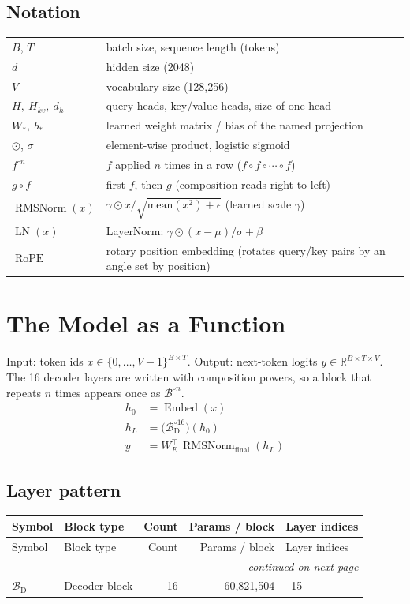 \documentclass[10pt,a4paper]{article}
\newcommand{\op}[1]{\operatorname{#1}}
\begin{document}
\subsection*{Notation}
\begin{tabular}{ll}
\toprule
$B$, $T$ & batch size, sequence length (tokens) \\
$d$ & hidden size (2048) \\
$V$ & vocabulary size (128,256) \\
$H,\ H_{kv},\ d_h$ & query heads, key/value heads, size of one head \\
$W_\ast,\ b_\ast$ & learned weight matrix / bias of the named projection \\
$\odot$, $\sigma$ & element-wise product, logistic sigmoid \\
$f^{\circ n}$ & $f$ applied $n$ times in a row ($f\circ f\circ\cdots\circ f$) \\
$g \circ f$ & first $f$, then $g$ (composition reads right to left) \\
$\op{RMSNorm}(x)$ & $\gamma \odot x / \sqrt{\mathrm{mean}(x^2)+\epsilon}$ (learned scale $\gamma$) \\
$\op{LN}(x)$ & LayerNorm: $\gamma\odot(x-\mu)/\sigma + \beta$ \\
$\op{RoPE}$ & rotary position embedding (rotates query/key pairs by an angle set by position) \\
\bottomrule
\end{tabular}
\section{The Model as a Function}\label{sec:func}
Input: token ids $x \in \{0,\dots,V{-}1\}^{B\times T}$. Output: next-token logits $y \in \mathbb{R}^{B\times T\times V}$. The 16 decoder layers are written with composition powers, so a block that repeats $n$ times appears once as $\mathcal{B}^{\circ n}$.
\begin{align*}
  h_0 &= \op{Embed}(x) \\
  h_L &= \Big(\mathcal{B}_{\mathrm{D}}^{\circ 16}\Big)(h_0) \\
  y &= W_{E}^{\top}\,\op{RMSNorm}_{\mathrm{final}}(h_L)
\end{align*}
\subsection{Layer pattern}
\begin{longtable}{l>{\raggedright\arraybackslash}p{5.6cm}rr>{\raggedright\arraybackslash}p{4.4cm}}
\toprule
Symbol & Block type & Count & Params / block & Layer indices \\
\midrule
\endfirsthead
\toprule
Symbol & Block type & Count & Params / block & Layer indices \\
\midrule
\endhead
\midrule \multicolumn{5}{r}{\textit{continued on next page}} \\
\endfoot
\bottomrule
\endlastfoot
$\mathcal{B}_{\mathrm{D}}$ & Decoder block & 16 & 60,821,504 & 0--15 \\
\end{longtable}
\end{document}
